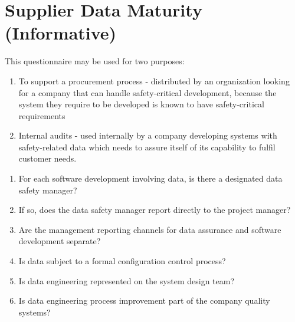 %
%
\section{Supplier Data Maturity (Informative)} \label{bkm:maturity}


This questionnaire may be used for two purposes:
\begin{enumerate}
  \item To support a procurement process - distributed by an organization looking for a company that can handle safety-critical development, because the system they require to be developed is known to have safety-critical requirements
  \item Internal audits - used internally by a company developing systems with safety-related data which needs to assure itself of its capability to fulfil customer needs.
\end{enumerate}

\begin{enumerate}
  \item For each software development involving data, is there a designated data safety manager?
  \item If so, does the data safety manager report directly to the project manager?
  \item Are the management reporting channels for data assurance and software development separate?
  \item Is data subject to a formal configuration control process? 
  \item Is data engineering represented on the system design team?
  \item Is data engineering process improvement part of the company quality systems?
\end{enumerate}

